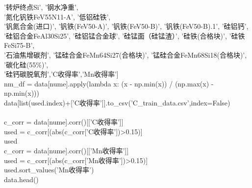 \documentclass{xcumcmart}
\begin{document}
		'转炉终点Si', '钢水净重',   \\
		'氮化钒铁FeV55N11-A', '低铝硅铁',  \\
		'钒氮合金(进口)', '钒铁(FeV50-A)', '钒铁(FeV50-B)', '钒铁(FeV50-B).1', '硅铝钙',  \\
		'硅铝合金FeAl30Si25', '硅铝锰合金球', '硅锰面（硅锰渣）', '硅铁(合格块)', '硅铁FeSi75-B',  \\
		'石油焦增碳剂', '锰硅合金FeMn64Si27(合格块)', '锰硅合金FeMn68Si18(合格块)', '碳化硅(55\%)',  \\
		'硅钙碳脱氧剂','C收得率','Mn收得率']  \\
nm\_df = data[nume].apply(lambda x: (x - np.min(x)) / (np.max(x) - np.min(x)))  \\
data[list(used.index)+['C收得率']].to\_csv('C\_train\_data.csv',index=False)  \\
\\
c\_corr = data[nume].corr()[['C收得率']]  \\
used = c\_corr[(abs(c\_corr['C收得率'])>0.15)]  \\
used  \\
c\_corr = data[nume].corr()[['Mn收得率']]  \\
used = c\_corr[(abs(c\_corr['Mn收得率'])>0.15)]  \\
used.sort\_values('Mn收得率')  \\
data.head()  \\
\end{document}
